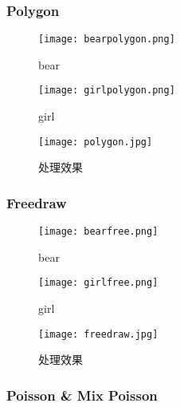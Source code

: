 \documentclass[14pt]{scrartcl} %
\begin{document}
\pagebreak
\subsubsection{Polygon}

\begin{figure}[h] %
	\begin{minipage}[t]{0.5\linewidth}
		\centering
		\texttt{[image: bearpolygon.png]}
		\caption{bear}
	\end{minipage}%
	\begin{minipage}[t]{0.5\linewidth}
		\centering
		\texttt{[image: girlpolygon.png]}
		\caption{girl}
	\end{minipage}
\end{figure}

\begin{figure}[h] %
	\centering
	\texttt{[image: polygon.jpg]} %
	\caption{处理效果}
\end{figure}

\pagebreak

\subsubsection{Freedraw}

\begin{figure}[h] %
	\begin{minipage}[t]{0.5\linewidth}
		\centering
		\texttt{[image: bearfree.png]}
		\caption{bear}
	\end{minipage}%
	\begin{minipage}[t]{0.5\linewidth}
		\centering
		\texttt{[image: girlfree.png]}
		\caption{girl}
	\end{minipage}
\end{figure}

\begin{figure}[h] %
	\centering
	\texttt{[image: freedraw.jpg]} %
	\caption{处理效果}
\end{figure}

\pagebreak
\subsubsection{Poisson \& Mix Poisson}
\end{document}

